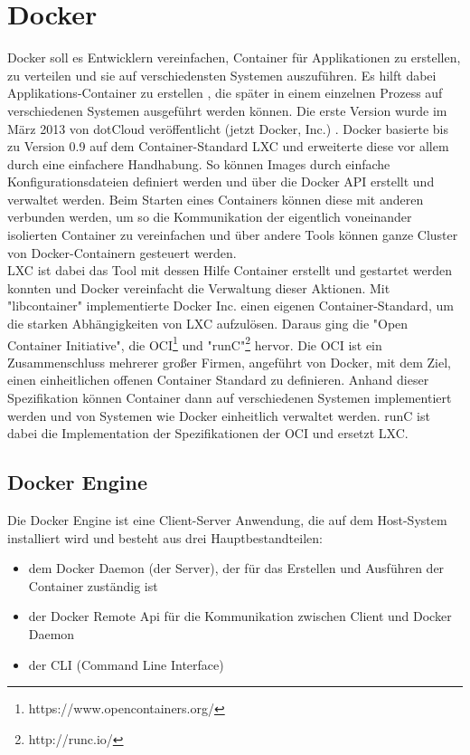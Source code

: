 \chapter{Docker}

Docker soll es Entwicklern vereinfachen, Container für Applikationen zu erstellen, zu verteilen und sie auf verschiedensten Systemen auszuführen. Es hilft dabei Applikations-Container zu erstellen \cite{docker}, die später in einem einzelnen Prozess auf verschiedenen Systemen ausgeführt werden können. Die erste Version wurde im März 2013 von dotCloud veröffentlicht (jetzt Docker, Inc.) \cite{docker:rel}.
Docker basierte bis zu Version 0.9 \cite{docker:cl} auf dem Container-Standard LXC und erweiterte diese vor allem durch eine einfachere Handhabung. So können Images durch einfache Konfigurationsdateien definiert werden und über die Docker API erstellt und verwaltet werden. Beim Starten eines Containers können diese mit anderen verbunden werden, um so die Kommunikation der eigentlich voneinander isolierten Container zu vereinfachen und über andere Tools können ganze Cluster von Docker-Containern gesteuert werden.\\

\noindent LXC ist dabei das Tool mit dessen Hilfe Container erstellt und gestartet werden konnten und Docker vereinfacht die Verwaltung dieser Aktionen. Mit "{}libcontainer"{} implementierte Docker Inc. einen eigenen Container-Standard, um die starken Abhängigkeiten von LXC aufzulösen. Daraus ging die "{}Open Container Initiative"{}, die OCI\footnote{https://www.opencontainers.org/} und "{}runC"{}\footnote{http://runc.io/} hervor. Die OCI ist ein Zusammenschluss mehrerer großer Firmen, angeführt von Docker, mit dem Ziel, einen einheitlichen offenen Container Standard zu definieren. Anhand dieser Spezifikation können Container dann auf verschiedenen Systemen implementiert werden und von Systemen wie Docker einheitlich verwaltet werden. runC ist dabei die Implementation der Spezifikationen der OCI und ersetzt LXC.

\section{Docker Engine}

Die Docker Engine ist eine Client-Server Anwendung, die auf dem Host-System installiert wird und besteht aus drei Hauptbestandteilen:\\

\begin{itemize}
  \item dem Docker Daemon (der Server), der für das Erstellen und Ausführen der Container zuständig ist
  \item der Docker Remote Api für die Kommunikation zwischen Client und Docker Daemon
  \item der CLI (Command Line Interface)
\end{itemize}

